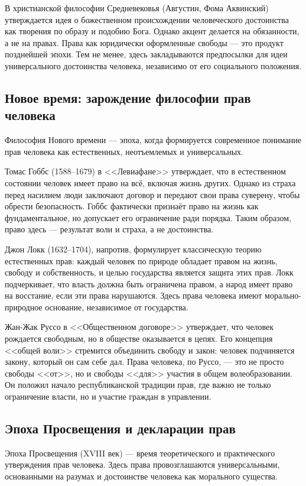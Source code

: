 \documentclass[12pt,a4paper]{article}
\begin{document}
	В христианской философии Средневековья (Августин, Фома Аквинский) утверждается идея о божественном происхождении человеческого достоинства как творения по образу и подобию Бога. Однако акцент делается на обязанности, а не на правах. Права как юридически оформленные свободы — это продукт позднейшей эпохи. Тем не менее, здесь закладываются предпосылки для идеи универсального достоинства человека, независимо от его социального положения.
	
	\subsection{Новое время: зарождение философии прав человека}
	Философия Нового времени — эпоха, когда формируется современное понимание прав человека как естественных, неотъемлемых и универсальных.
	
	Томас Гоббс (1588–1679) в <<Левиафане>> утверждает, что в естественном состоянии человек имеет право на всё, включая жизнь других. Однако из страха перед насилием люди заключают договор и передают свои права суверену, чтобы обрести безопасность. Гоббс фактически признаёт право на жизнь как фундаментальное, но допускает его ограничение ради порядка. Таким образом, право здесь — результат воли и страха, а не достоинства.
	
	Джон Локк (1632–1704), напротив, формулирует классическую теорию естественных прав: каждый человек по природе обладает правом на жизнь, свободу и собственность, и целью государства является защита этих прав. Локк подчеркивает, что власть должна быть ограничена правом, а народ имеет право на восстание, если эти права нарушаются. Здесь права человека имеют морально-природное основание, независимое от государства.
	
	Жан-Жак Руссо в <<Общественном договоре>> утверждает, что человек рождается свободным, но в обществе оказывается в цепях. Его концепция <<общей воли>> стремится объединить свободу и закон: человек подчиняется закону, который он сам себе дал. Права человека, по Руссо, — это не просто свободы <<от>>, но и свободы <<для>> участия в общем волеобразовании. Он положил начало республиканской традиции прав, где важно не только ограничение власти, но и участие граждан в управлении.
	
	\subsection{Эпоха Просвещения и декларации прав}
	Эпоха Просвещения (XVIII век) — время теоретического и практического утверждения прав человека. Здесь права провозглашаются универсальными, основанными на разумах и достоинстве человека как морального существа.
	
\end{document}
